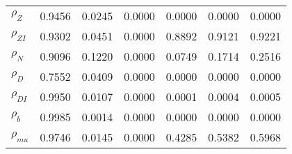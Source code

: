 \begin{center}
\begin{longtable}{lcccccc}
$ {\rho_Z}             $	 & 	          0.9456	 & 	          0.0245	 & 	          0.0000	 & 	          0.0000	 & 	          0.0000	 & 	          0.0000 \\ 
$ {\rho_{ZI}}          $	 & 	          0.9302	 & 	          0.0451	 & 	          0.0000	 & 	          0.8892	 & 	          0.9121	 & 	          0.9221 \\ 
$ {\rho_N}             $	 & 	          0.9096	 & 	          0.1220	 & 	          0.0000	 & 	          0.0749	 & 	          0.1714	 & 	          0.2516 \\ 
$ {\rho_D}             $	 & 	          0.7552	 & 	          0.0409	 & 	          0.0000	 & 	          0.0000	 & 	          0.0000	 & 	          0.0000 \\ 
$ {\rho_{DI}}          $	 & 	          0.9950	 & 	          0.0107	 & 	          0.0000	 & 	          0.0001	 & 	          0.0004	 & 	          0.0005 \\ 
$ {\rho_b}             $	 & 	          0.9985	 & 	          0.0014	 & 	          0.0000	 & 	          0.0000	 & 	          0.0000	 & 	          0.0000 \\ 
$ {\rho_{mu}}          $	 & 	          0.9746	 & 	          0.0145	 & 	          0.0000	 & 	          0.4285	 & 	          0.5382	 & 	          0.5968 \\ 
\end{longtable}
 \end{center}
